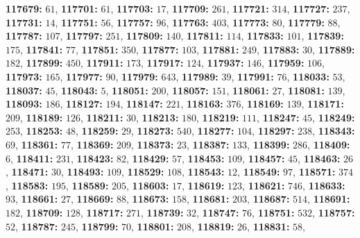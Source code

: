 \textsf{\bfseries 117679:} $61$, \textsf{\bfseries 117701:} $61$, \textsf{\bfseries 117703:} $17$, \textsf{\bfseries 117709:} $261$, \textsf{\bfseries 117721:} $314$, \textsf{\bfseries 117727:} $237$, \textsf{\bfseries 117731:} $14$, \textsf{\bfseries 117751:} $56$, \textsf{\bfseries 117757:} $96$, \textsf{\bfseries 117763:} $403$, \textsf{\bfseries 117773:} $80$, \textsf{\bfseries 117779:} $88$, \textsf{\bfseries 117787:} $107$, \textsf{\bfseries 117797:} $251$, \textsf{\bfseries 117809:} $140$, \textsf{\bfseries 117811:} $114$, \textsf{\bfseries 117833:} $101$, \textsf{\bfseries 117839:} $175$, \textsf{\bfseries 117841:} $77$, \textsf{\bfseries 117851:} $350$, \textsf{\bfseries 117877:} $103$, \textsf{\bfseries 117881:} $249$, \textsf{\bfseries 117883:} $30$, \textsf{\bfseries 117889:} $182$, \textsf{\bfseries 117899:} $450$, \textsf{\bfseries 117911:} $173$, \textsf{\bfseries 117917:} $124$, \textsf{\bfseries 117937:} $146$, \textsf{\bfseries 117959:} $106$, \textsf{\bfseries 117973:} $165$, \textsf{\bfseries 117977:} $90$, \textsf{\bfseries 117979:} $643$, \textsf{\bfseries 117989:} $39$, \textsf{\bfseries 117991:} $76$, \textsf{\bfseries 118033:} $53$, \textsf{\bfseries 118037:} $45$, \textsf{\bfseries 118043:} $5$, \textsf{\bfseries 118051:} $200$, \textsf{\bfseries 118057:} $151$, \textsf{\bfseries 118061:} $27$, \textsf{\bfseries 118081:} $139$, \textsf{\bfseries 118093:} $186$, \textsf{\bfseries 118127:} $194$, \textsf{\bfseries 118147:} $221$, \textsf{\bfseries 118163:} $376$, \textsf{\bfseries 118169:} $139$, \textsf{\bfseries 118171:} $209$, \textsf{\bfseries 118189:} $126$, \textsf{\bfseries 118211:} $30$, \textsf{\bfseries 118213:} $180$, \textsf{\bfseries 118219:} $111$, \textsf{\bfseries 118247:} $45$, \textsf{\bfseries 118249:} $253$, \textsf{\bfseries 118253:} $48$, \textsf{\bfseries 118259:} $29$, \textsf{\bfseries 118273:} $540$, \textsf{\bfseries 118277:} $104$, \textsf{\bfseries 118297:} $238$, \textsf{\bfseries 118343:} $69$, \textsf{\bfseries 118361:} $77$, \textsf{\bfseries 118369:} $209$, \textsf{\bfseries 118373:} $23$, \textsf{\bfseries 118387:} $133$, \textsf{\bfseries 118399:} $286$, \textsf{\bfseries 118409:} $6$, \textsf{\bfseries 118411:} $231$, \textsf{\bfseries 118423:} $82$, \textsf{\bfseries 118429:} $57$, \textsf{\bfseries 118453:} $109$, \textsf{\bfseries 118457:} $45$, \textsf{\bfseries 118463:} $26$, \textsf{\bfseries 118471:} $30$, \textsf{\bfseries 118493:} $109$, \textsf{\bfseries 118529:} $108$, \textsf{\bfseries 118543:} $12$, \textsf{\bfseries 118549:} $97$, \textsf{\bfseries 118571:} $374$, \textsf{\bfseries 118583:} $195$, \textsf{\bfseries 118589:} $205$, \textsf{\bfseries 118603:} $17$, \textsf{\bfseries 118619:} $123$, \textsf{\bfseries 118621:} $746$, \textsf{\bfseries 118633:} $93$, \textsf{\bfseries 118661:} $27$, \textsf{\bfseries 118669:} $88$, \textsf{\bfseries 118673:} $158$, \textsf{\bfseries 118681:} $203$, \textsf{\bfseries 118687:} $514$, \textsf{\bfseries 118691:} $182$, \textsf{\bfseries 118709:} $128$, \textsf{\bfseries 118717:} $271$, \textsf{\bfseries 118739:} $32$, \textsf{\bfseries 118747:} $76$, \textsf{\bfseries 118751:} $532$, \textsf{\bfseries 118757:} $52$, \textsf{\bfseries 118787:} $245$, \textsf{\bfseries 118799:} $70$, \textsf{\bfseries 118801:} $208$, \textsf{\bfseries 118819:} $26$, \textsf{\bfseries 118831:} $58$, 
